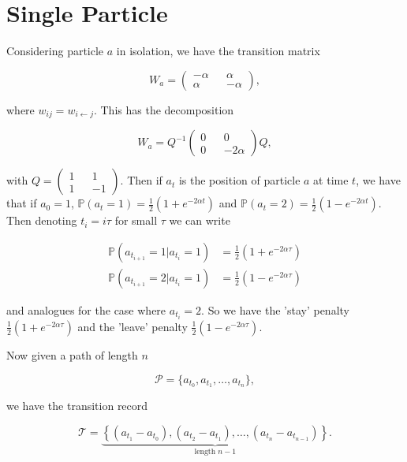 \documentclass{article}
\newcommand{\bP}{\mathbb{P}}
\begin{document}
\section{Single Particle} 
Considering particle $a$ in isolation, we have the transition matrix

\begin{equation}
  W_a = \begin{pmatrix} -\alpha && \alpha \\
  \alpha && -\alpha \end{pmatrix},
\end{equation}

where $w_{ij} = w_{i \leftarrow j}$. This has the decomposition

\begin{equation} W_a = Q^{-1} \begin{pmatrix} 0 && 0 \\
0 && -2\alpha \end{pmatrix} Q,
\end{equation}

with $Q = \begin{pmatrix} 1 && 1 \\
1 && -1 \end{pmatrix}$. Then if $a_t$ is the position of particle $a$ at time $t$, we have that if $a_0 = 1$, $\bP(a_t = 1) =\frac{1}{2}(1+e^{-2\alpha t})$ and $\bP(a_t = 2) = \frac{1}{2}(1-e^{-2\alpha t})$. Then denoting $t_i = i \tau$ for small $\tau$ we can write

\begin{align}
  \bP(a_{t_{i+1}} = 1 | a_{t_i} = 1) &= \frac{1}{2} (1+e^{-2\alpha \tau}) \\
  \bP(a_{t_{i+1}} = 2 | a_{t_i} = 1) &= \frac{1}{2} (1-e^{-2\alpha \tau})
\end{align}

and analogues for the case where $a_{t_i} = 2$. So we have the 'stay' penalty $\frac{1}{2}(1+e^{-2\alpha \tau})$ and the 'leave' penalty $\frac{1}{2}(1-e^{-2\alpha \tau})$.

Now given a path of length $n$

\begin{equation}\mathcal{P} = \{ a_{t_0}, a_{t_1}, \ldots, a_{t_n}\},
\end{equation}

we have the transition record

\begin{equation}\mathcal{T} = \underbrace{\left \{ (a_{t_1}-a_{t_0}), (a_{t_2}-a_{t_1}), \ldots, (a_{t_n}-a_{t_{n-1}}) \right \}}_{\text{length } n-1}.
\end{equation}
\end{document}

